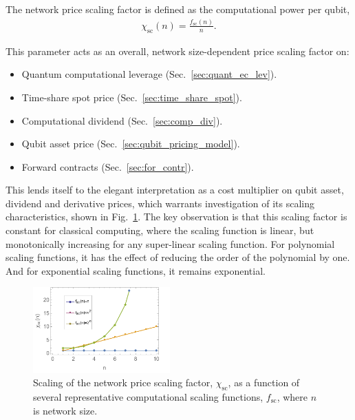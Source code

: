 \begin{definition}\label{def:NPSF}
The network price scaling factor is defined as the computational power per qubit,
\begin{align}
\chi_\text{sc}(n) = \frac{f_\text{sc}(n)}{n}.
\end{align}
\end{definition}

This parameter acts as an overall, network size-dependent price scaling factor on:
\begin{itemize}
\item Quantum computational leverage (Sec.~\ref{sec:quant_ec_lev}).
\item Time-share spot price (Sec.~\ref{sec:time_share_spot}).
\item Computational dividend (Sec.~\ref{sec:comp_div}).
\item Qubit asset price (Sec.~\ref{sec:qubit_pricing_model}).
\item Forward contracts (Sec.~\ref{sec:for_contr}).
\end{itemize}

This lends itself to the elegant interpretation as a cost multiplier on qubit asset, dividend and derivative prices, which warrants investigation of its scaling characteristics, shown in Fig.~\ref{fig:NPSF}. The key observation is that this scaling factor is constant for classical computing, where the scaling function is linear, but monotonically increasing for any super-linear scaling function. For polynomial scaling functions, it has the effect of reducing the order of the polynomial by one. And for exponential scaling functions, it remains exponential.

\begin{figure}[htb!]
	\includegraphics[width=0.47\textwidth]{network_price_scaling_factor}
	\caption{Scaling of the network price scaling factor, $\chi_\text{sc}$, as a function of several representative computational scaling functions, $f_\text{sc}$, where $n$ is network size.} \label{fig:NPSF}
\end{figure}

